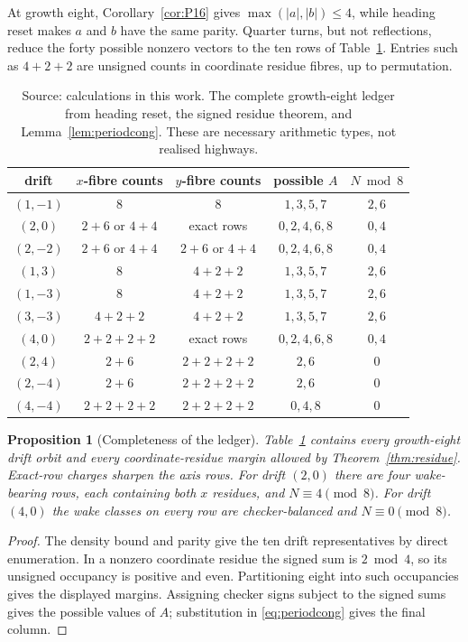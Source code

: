 \documentclass[11pt,letterpaper]{article}
\theoremstyle{plain}
\newtheorem{proposition}[theorem]{Proposition}
\theoremstyle{definition}
\begin{document}
\begin{NoHyper}
At growth eight, Corollary~\ref{cor:P16} gives
$\max(|a|,|b|)\le4$, while heading reset makes $a$ and $b$ have the same parity.
Quarter turns, but not reflections, reduce the forty possible nonzero vectors to
the ten rows of Table~\ref{tab:g8ledger}.  Entries such as $4+2+2$ are unsigned
counts in coordinate residue fibres, up to permutation.

\begin{table}[t]
\centering
\normalsize
\begin{tabular}{@{}ccccc@{}}
\toprule
drift & $x$-fibre counts & $y$-fibre counts & possible $A$ & $N\bmod8$\\
\midrule
$(1,-1)$ & $8$ & $8$ & $1,3,5,7$ & $2,6$\\
$(2,0)$ & $2+6$ or $4+4$ & exact rows & $0,2,4,6,8$ & $0,4$\\
$(2,-2)$ & $2+6$ or $4+4$ & $2+6$ or $4+4$ & $0,2,4,6,8$ & $0,4$\\
$(1,3)$ & $8$ & $4+2+2$ & $1,3,5,7$ & $2,6$\\
$(1,-3)$ & $8$ & $4+2+2$ & $1,3,5,7$ & $2,6$\\
$(3,-3)$ & $4+2+2$ & $4+2+2$ & $1,3,5,7$ & $2,6$\\
$(4,0)$ & $2+2+2+2$ & exact rows & $0,2,4,6,8$ & $0,4$\\
$(2,4)$ & $2+6$ & $2+2+2+2$ & $2,6$ & $0$\\
$(2,-4)$ & $2+6$ & $2+2+2+2$ & $2,6$ & $0$\\
$(4,-4)$ & $2+2+2+2$ & $2+2+2+2$ & $0,4,8$ & $0$\\
\bottomrule
\end{tabular}
\caption{Source: calculations in this work. The complete growth-eight ledger from heading reset, the signed
residue theorem, and Lemma~\ref{lem:periodcong}.  These are necessary
arithmetic types, not realised highways.}
\label{tab:g8ledger}
\end{table}

\begin{proposition}[Completeness of the ledger]\label{prop:g8ledger}
Table~\ref{tab:g8ledger} contains every growth-eight drift orbit and every
coordinate-residue margin allowed by Theorem~\ref{thm:residue}.  Exact-row
charges sharpen the axis rows.  For drift $(2,0)$ there are four wake-bearing rows,
each containing both $x$ residues, and $N\equiv4\pmod8$.  For drift $(4,0)$
the wake classes on every row are checker-balanced and $N\equiv0\pmod8$.
\end{proposition}

\begin{proof}
The density bound and parity give the ten drift representatives by direct
enumeration.  In a nonzero coordinate residue the signed sum is $2\bmod4$, so
its unsigned occupancy is positive and even.  Partitioning eight into such
occupancies gives the displayed margins.  Assigning checker signs subject to
the signed sums gives the possible values of $A$; substitution in
\eqref{eq:periodcong} gives the final column.


\end{proof}
\end{NoHyper}
\end{document}
